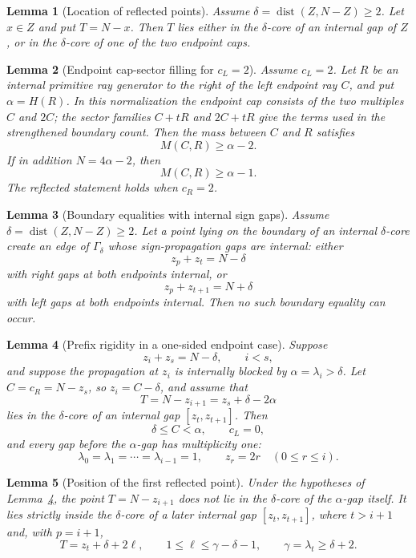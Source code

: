 \documentclass[10pt,a4paper]{amsart}
\newtheorem{lemma}{Lemma}
\newcommand{\dist}{\operatorname{dist}}
\begin{document}
\begin{lemma}[Location of reflected points]\label{lem:target-placement}
Assume $\delta=\dist(Z,N-Z)\ge2$.  Let $x\in Z$ and put $T=N-x$.  Then $T$ lies either in the $\delta$-core of an internal gap of $Z$, or in the $\delta$-core of one of the two endpoint caps.
\end{lemma}

\begin{lemma}[Endpoint cap-sector filling for \(c_L=2\)]\label{lem:width-three}
Assume \(c_L=2\).  Let \(R\) be an internal primitive ray generator to the right of the left endpoint ray \(C\), and put \(\alpha=H(R)\).  In this normalization the endpoint cap consists of the two multiples \(C\) and \(2C\); the sector families \(C+tR\) and \(2C+tR\) give the terms used in the strengthened boundary count.  Then the mass between \(C\) and \(R\) satisfies
\[
        M(C,R)\ge \alpha-2.
\]
If in addition \(N=4\alpha-2\), then
\[
        M(C,R)\ge \alpha-1.
\]
The reflected statement holds when \(c_R=2\).
\end{lemma}

\begin{lemma}[Boundary equalities with internal sign gaps]\label{lem:boundary-created-internal-edge}
Assume \(\delta=\dist(Z,N-Z)\ge2\).  Let a point lying on the boundary of an internal \(\delta\)-core create an edge of \(\Gamma_\delta\) whose sign-propagation gaps are internal: either
\[
        z_p+z_t=N-\delta
\]
with right gaps at both endpoints internal, or
\[
        z_p+z_{t+1}=N+\delta
\]
with left gaps at both endpoints internal.  Then no such boundary equality can occur.
\end{lemma}

\begin{lemma}[Prefix rigidity in a one-sided endpoint case]\label{lem:endpoint-blocked-initial}
Suppose
\[
        z_i+z_s=N-\delta,
        \qquad i<s,
\]
and suppose the propagation at $z_i$ is internally blocked by $\alpha=\lambda_i>\delta$.  Let $C=c_R=N-z_s$, so $z_i=C-\delta$, and assume that
\[
        T=N-z_{i+1}=z_s+\delta-2\alpha
\]
lies in the $\delta$-core of an internal gap $[z_t,z_{t+1}]$.  Then
\[
        \delta\le C<\alpha,
        \qquad
        c_L=0,
\]
and every gap before the $\alpha$-gap has multiplicity one:
\[
        \lambda_0=\lambda_1=\cdots=\lambda_{i-1}=1,
        \qquad
        z_r=2r\quad(0\le r\le i).
\]
\end{lemma}

\begin{lemma}[Position of the first reflected point]\label{lem:endpoint-blocked-position}
Under the hypotheses of Lemma~\ref{lem:endpoint-blocked-initial}, the point $T=N-z_{i+1}$ does not lie in the $\delta$-core of the $\alpha$-gap itself.  It lies strictly inside the $\delta$-core of a later internal gap $[z_t,z_{t+1}]$, where $t>i+1$ and, with $p=i+1$,
\[
        T=z_t+\delta+2\ell,
        \qquad
        1\le \ell\le \gamma-\delta-1,
        \qquad
        \gamma=\lambda_t\ge\delta+2.
\]
\end{lemma}
\end{document}
